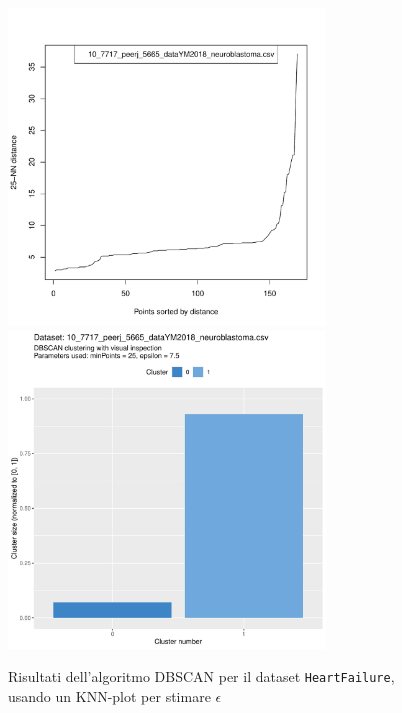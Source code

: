 \documentclass[a4paper, 12pt]{report}
\begin{document}
			\begin{figure}[H]
				\centering
				\includegraphics[width = 0.75\textwidth, height = 0.45\textheight, page = 1]{
					doc/DBSCAN_optimal_MinPts.pdf
				}
				\includegraphics[width = 0.75\textwidth, height = 0.45\textheight, page = 1]{
					results/DBSCAN_visual_comparison.pdf
				}
				\caption{Risultati dell'algoritmo DBSCAN per il dataset
				\texttt{HeartFailure}, usando un KNN-plot per stimare $\epsilon$}
				\label{fig:dbscan-extra1}
			\end{figure}
\end{document}
